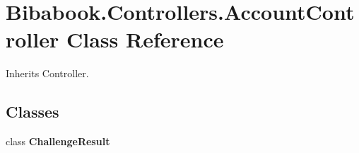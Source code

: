 \hypertarget{class_bibabook_1_1_controllers_1_1_account_controller}{}\section{Bibabook.\+Controllers.\+Account\+Controller Class Reference}
\label{class_bibabook_1_1_controllers_1_1_account_controller}


Inherits Controller.

\subsection*{Classes}
\begin{DoxyCompactItemize}
\item 
class {\bfseries Challenge\+Result}
\end{DoxyCompactItemize}
